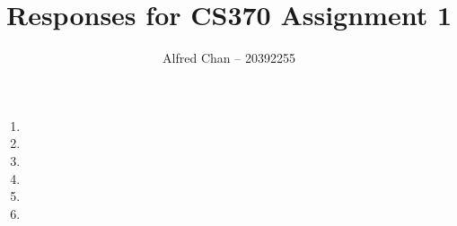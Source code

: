 \documentclass[12pt]{article}
\title{Responses for CS370 Assignment 1}
\author{Alfred Chan -- 20392255}
\begin{document}
\maketitle

\begin{enumerate}
\item
\item
\item
\item
\item
\item

\end{enumerate}
\end{document}
